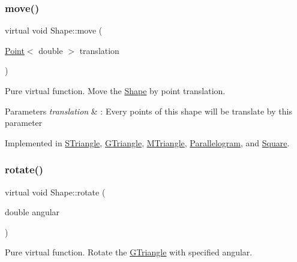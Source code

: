 \mbox{\label{classShape_a52649731b2cb7b67315882d5e005f7e8}} 
\subsubsection{\texorpdfstring{move()}{move()}}
{\footnotesize\ttfamily virtual void Shape\+::move (\begin{DoxyParamCaption}\item[{\hyperlink{classPoint}{Point}$<$ double $>$}]{translation }\end{DoxyParamCaption})\hspace{0.3cm}{\ttfamily [pure virtual]}}



Pure virtual function. Move the \hyperlink{classShape}{Shape} by point translation. 


\begin{DoxyParams}{Parameters}
{\em translation} & \+: Every points of this shape will be translate by this parameter \\
\hline
\end{DoxyParams}


Implemented in \hyperlink{classSTriangle_a9cd1c7e14501b314405745dcc296ee63}{S\+Triangle}, \hyperlink{classGTriangle_a89910a7f176743473d3bfd15de01377d}{G\+Triangle}, \hyperlink{classMTriangle_a1b029feefcf7e3febcdae179557b4c2e}{M\+Triangle}, \hyperlink{classParallelogram_a982287c8d16ec47951db62b07eb77feb}{Parallelogram}, and \hyperlink{classSquare_a6be02369ff07934179f6bfd6360fb9d3}{Square}.

\mbox{\label{classShape_a2dea8616fd40f2d69fd208715921982a}} 
\subsubsection{\texorpdfstring{rotate()}{rotate()}}
{\footnotesize\ttfamily virtual void Shape\+::rotate (\begin{DoxyParamCaption}\item[{double}]{angular }\end{DoxyParamCaption})\hspace{0.3cm}{\ttfamily [pure virtual]}}



Pure virtual function. Rotate the \hyperlink{classGTriangle}{G\+Triangle} with specified angular. 


